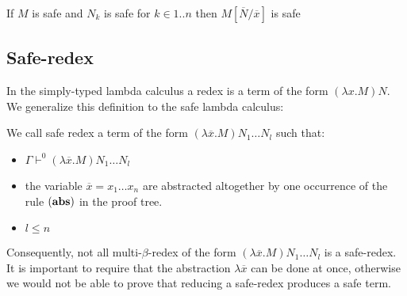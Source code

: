 \begin{cor}
If $M$ is safe and $N_k$ is safe for $k \in 1..n$ then  $M[\overline{N}/\overline{x}]$ is safe
\end{cor}

\subsection{Safe-redex}

In the simply-typed lambda calculus a redex is a term of the form
$(\lambda x . M) N$. We generalize this definition to the safe
lambda calculus:

\begin{dfn}
We call safe redex a term of the form $(\lambda \overline{x} . M)
N_1 \ldots N_l$ such that:
\begin{itemize}
\item $ \Gamma \vdash^0 (\lambda \overline{x} . M) N_1 \ldots N_l $
\item the variable $\overline{x}=x_1\ldots x_n$ are abstracted altogether by one occurrence of the rule $\mathbf{(abs)}$ in the proof tree.

\item $l\leq n$
\end{itemize}

\end{dfn}

Consequently, not all multi-$\beta$-redex of the form $(\lambda
\overline{x} . M) N_1 \ldots N_l$ is a safe-redex. It is important
to require that the abstraction $\lambda \overline{x}$ can be done
at once, otherwise we would not be able to prove that reducing a
safe-redex produces a safe term.



